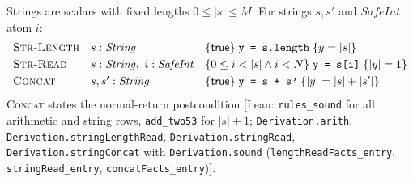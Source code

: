 \documentclass[10pt,a4paper]{article}
\theoremstyle{definition}
\theoremstyle{remark}
\newcommand{\kw}[1]{\mathsf{#1}}
\newcommand{\len}[1]{|#1|}
\newcommand{\hoare}[3]{\{#1\}\;#2\;\{#3\}}
\newcommand{\code}[1]{\texttt{#1}}
\newcommand{\lean}[1]{\texttt{\small #1}}
\newcommand{\status}[1]{\textsf{\small[#1]}}
\begin{document}
Strings are scalars with fixed lengths $0\le\len s\le M$. For strings
$s,s'$ and $\mathit{SafeInt}$ atom $i$:
{\small\begin{displaymath}
\begin{array}{@{}lll@{}}
\textsc{Str-Length} & s:\mathit{String} & \hoare{\kw{true}}{\code{y = s.length}}{y=\len s}\\[3pt]
\textsc{Str-Read} & s:\mathit{String},\ i:\mathit{SafeInt} & \hoare{0\le i<\len s\wedge i<N}{\code{y = s[i]}}{\len y=1}\\[3pt]
\textsc{Concat} & s,s':\mathit{String} & \hoare{\kw{true}}{\code{y = s + s'}}{\len y=\len s+\len{s'}}
\end{array}
\end{displaymath}}
\textsc{Concat} states the normal-return postcondition
\status{Lean: \lean{rules\_sound} for all arithmetic and string rows, \lean{add\_two53} for $\len s+1$; \lean{Derivation.arith}, \lean{Derivation.stringLengthRead}, \lean{Derivation.stringRead}, \lean{Derivation.stringConcat} with \lean{Derivation.sound} (\lean{lengthReadFacts\_entry}, \lean{stringRead\_entry}, \lean{concatFacts\_entry})}.
\end{document}
